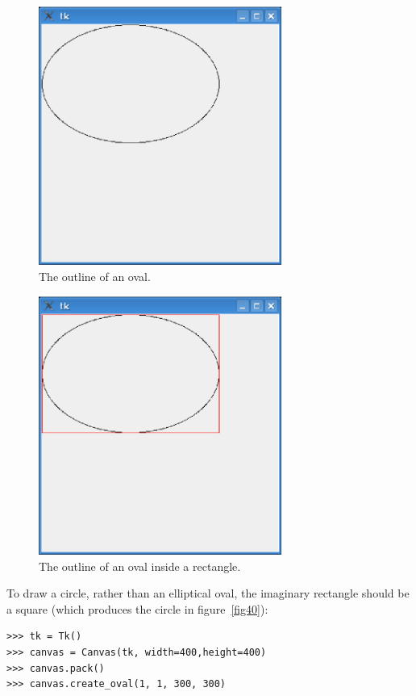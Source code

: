 \begin{figure}
\begin{center}
\includegraphics[width=80mm]{eps/figure38.eps}
\end{center}
\caption{The outline of an oval.}\label{fig38}
\end{figure}

\begin{figure}
\begin{center}
\includegraphics[width=80mm]{eps/figure39.eps}
\end{center}
\caption{The outline of an oval inside a rectangle.}\label{fig39}
\end{figure}

\noindent
To draw a circle, rather than an elliptical oval, the imaginary rectangle should be a square (which produces the circle in figure~\ref{fig40}):

\begin{listing}
\begin{verbatim}
>>> tk = Tk()
>>> canvas = Canvas(tk, width=400,height=400)
>>> canvas.pack()
>>> canvas.create_oval(1, 1, 300, 300)
\end{verbatim}
\end{listing}

